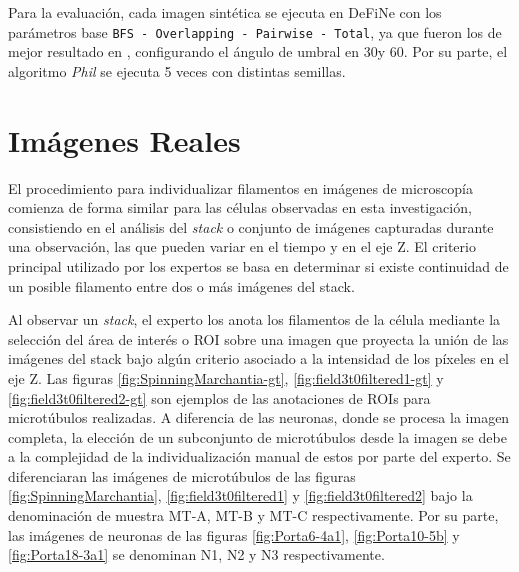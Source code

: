 Para la evaluaci\'on, cada imagen sint\'etica se ejecuta en DeFiNe con los par\'ametros base {\tt BFS - Overlapping - Pairwise - Total}, ya que fueron los de mejor resultado en \cite{breuer2015define}, configurando el \'angulo de umbral en 30\textdegree y 60\textdegree. Por su parte, el algoritmo {\it Phil} se ejecuta 5 veces con distintas semillas.

\section{Im\'agenes Reales}
El procedimiento para individualizar filamentos en im\'agenes de microscop\'ia
comienza de forma similar para las c\'elulas observadas en esta investigaci\'on, consistiendo en el an\'alisis del {\it stack} o conjunto de im\'agenes capturadas durante una observaci\'on, las que pueden variar en el tiempo y en el eje Z. El criterio principal utilizado por los expertos se basa en determinar si existe continuidad de un posible filamento entre dos o m\'as im\'agenes del stack. %

Al observar un {\it stack}, el experto los anota los filamentos de la c\'elula mediante la selecci\'on del \'area de inter\'es o ROI sobre una imagen que proyecta la uni\'on de las im\'agenes del stack bajo alg\'un criterio asociado a la intensidad de los p\'ixeles en el eje Z. Las figuras \ref{fig:SpinningMarchantia-gt}, \ref{fig:field3t0filtered1-gt} y \ref{fig:field3t0filtered2-gt} son ejemplos de las anotaciones de ROIs para microt\'ubulos realizadas. A diferencia de las neuronas, donde se procesa la imagen completa, la elecci\'on de un subconjunto de microt\'ubulos desde la imagen se debe a la complejidad de la individualizaci\'on manual de estos por parte del experto. Se diferenciaran las im\'agenes de microt\'ubulos de las figuras \ref{fig:SpinningMarchantia}, \ref{fig:field3t0filtered1} y \ref{fig:field3t0filtered2} bajo la denominaci\'on de muestra MT-A, MT-B y MT-C respectivamente. Por su parte, las im\'agenes de neuronas de las figuras \ref{fig:Porta6-4a1}, \ref{fig:Porta10-5b} y \ref{fig:Porta18-3a1}  se denominan N1, N2 y N3 respectivamente.


